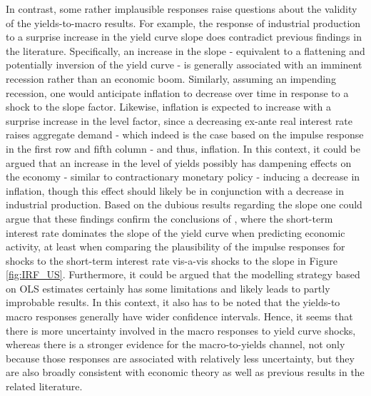 In contrast, some rather implausible responses raise questions about the validity of the yields-to-macro results. 
For example, the response of industrial production to a surprise increase in the yield curve slope does contradict previous findings in the literature. 
Specifically, an increase in the slope - equivalent to a flattening and potentially inversion of the yield curve - is generally associated with an imminent recession rather than an economic boom. 
Similarly, assuming an impending recession, one would anticipate inflation to decrease over time in response to a shock to the slope factor.
Likewise, inflation is expected to increase with a surprise increase in the level factor, since a decreasing ex-ante real interest rate raises aggregate demand - which indeed is the case based on the impulse response in the first row and fifth column - and thus, inflation. 
In this context, it could be argued that an increase in the level of yields possibly has dampening effects on the economy - similar to contractionary monetary policy - inducing a decrease in inflation, though this effect should likely be in conjunction with a decrease in industrial production.
Based on the dubious results regarding the slope one could argue that these findings confirm the conclusions of \citet{ang2006does}, where the short-term interest rate dominates the slope of the yield curve when predicting economic activity, at least when comparing the plausibility of the impulse responses for shocks to the short-term interest rate vis-a-vis shocks to the slope in Figure \ref{fig:IRF_US}. 
Furthermore, it could be argued that the modelling strategy based on OLS estimates certainly has some limitations and likely leads to partly improbable results. 
In this context, it also has to be noted that the yields-to macro responses generally have wider confidence intervals. Hence, it seems that there is more uncertainty involved in the macro responses to yield curve shocks, whereas there is a stronger evidence for the macro-to-yields channel, not only because those responses are associated with relatively less uncertainty, but they are also broadly consistent with economic theory as well as previous results in the related literature. 


